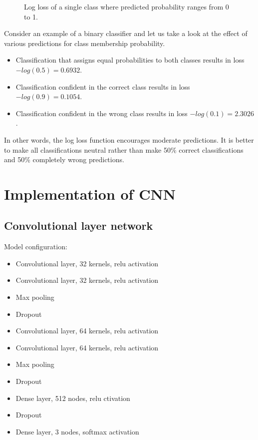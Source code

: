 \documentclass[a4paper, 11pt, table]{article}
\begin{document}
\begin{figure}[H]
\centering
{}
\caption{\label{fig:logloss} Log loss of a single class where predicted probability ranges from 0 to 1. }
\end{figure}

Consider an example of a binary classifier and let us take a look at the effect of various predictions for class membership probability. 
\begin{itemize}
\item Classification that assigns equal probabilities to both classes results in loss $-log(0.5)=0.6932$.  

\item Classification confident in the correct class results in loss $-log(0.9)=0.1054$.

\item Classification confident in the wrong class results in loss $-log(0.1)=2.3026$. 
\end{itemize}

In other words, the log loss function encourages moderate predictions. It is better to make all classifications neutral rather than make 50\% correct classifications and 50\% completely wrong predictions.

\section{Implementation of CNN}

\subsection{Convolutional layer network}

Model configuration:
\begin{itemize}
\item Convolutional layer, 32 kernels, relu activation
\item Convolutional layer, 32 kernels, relu activation
\item Max pooling
\item Dropout
\item Convolutional layer, 64 kernels, relu activation
\item Convolutional layer, 64 kernels, relu activation
\item Max pooling
\item Dropout
\item Dense layer, 512 nodes, relu ctivation
\item Dropout
\item Dense layer, 3 nodes, softmax activation

\end{itemize}
\end{document}
